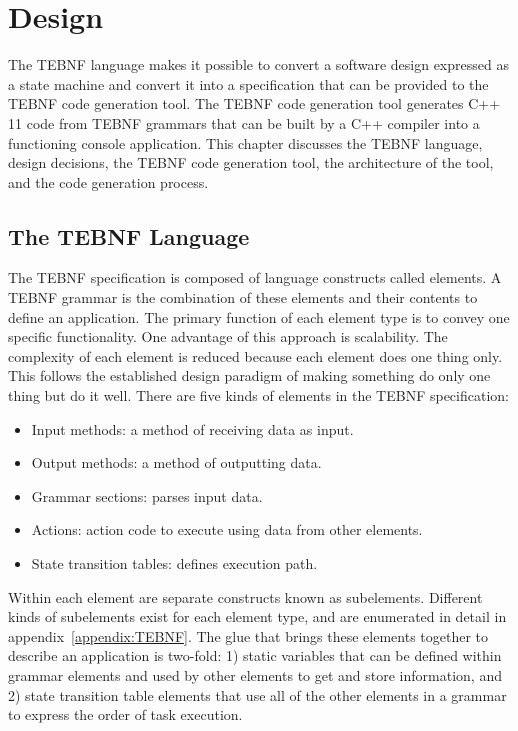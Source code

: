 \chapter{Design}
The TEBNF language makes it possible to convert a software design expressed as a state machine and convert it into a specification that can be provided to the TEBNF code generation tool.  The TEBNF code generation tool generates C++ 11 code from TEBNF grammars that can be built by a C++ compiler into a functioning console application.  This chapter discusses the TEBNF language, design decisions, the TEBNF code generation tool, the architecture of the tool, and the code generation process.

\section{The TEBNF Language}
The TEBNF specification is composed of language constructs called elements.  A TEBNF grammar is the combination of these elements and their contents to define an application.   The primary function of each element type is to convey one specific functionality.  One advantage of this approach is scalability.  The complexity of each element is reduced because each element does one thing only.  This follows the established design paradigm of making something do only one thing but do it well.  There are five kinds of elements in the TEBNF specification:
\begin{itemize}
  \item Input methods: a method of receiving data as input.
  \item Output methods: a method of outputting data.
  \item Grammar sections: parses input data. 
  \item Actions: action code to execute using data from other elements.
  \item State transition tables: defines execution path.
\end{itemize}

\indent
Within each element are separate constructs known as subelements.  Different kinds of subelements exist for each element type, and are enumerated in detail in appendix~\ref{appendix:TEBNF}.  The glue that brings these elements together to describe an application is two-fold: 1) static variables that can be defined within grammar elements and used by other elements to get and store information, and 2) state transition table elements that use all of the other elements in a grammar to express the order of task execution.

